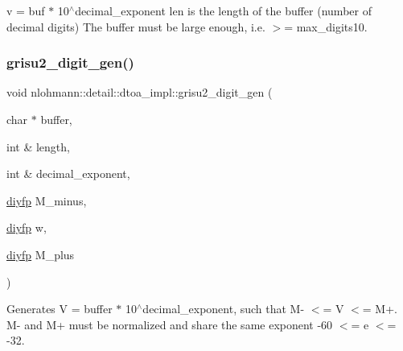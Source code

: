 v = buf $\ast$ 10$^\wedge$decimal\+\_\+exponent len is the length of the buffer (number of decimal digits) The buffer must be large enough, i.\+e. $>$= max\+\_\+digits10. \mbox{\label{namespacenlohmann_1_1detail_1_1dtoa__impl_a9b899c72b0e1e3dd46d75c2b4e6bcdfb}} 
\subsubsection{\texorpdfstring{grisu2\_digit\_gen()}{grisu2\_digit\_gen()}}
{\footnotesize\ttfamily void nlohmann\+::detail\+::dtoa\+\_\+impl\+::grisu2\+\_\+digit\+\_\+gen (\begin{DoxyParamCaption}\item[{char $\ast$}]{buffer,  }\item[{int \&}]{length,  }\item[{int \&}]{decimal\+\_\+exponent,  }\item[{\mbox{\hyperlink{structnlohmann_1_1detail_1_1dtoa__impl_1_1diyfp}{diyfp}}}]{M\+\_\+minus,  }\item[{\mbox{\hyperlink{structnlohmann_1_1detail_1_1dtoa__impl_1_1diyfp}{diyfp}}}]{w,  }\item[{\mbox{\hyperlink{structnlohmann_1_1detail_1_1dtoa__impl_1_1diyfp}{diyfp}}}]{M\+\_\+plus }\end{DoxyParamCaption})\hspace{0.3cm}{\ttfamily [inline]}}

Generates V = buffer $\ast$ 10$^\wedge$decimal\+\_\+exponent, such that M-\/ $<$= V $<$= M+. M-\/ and M+ must be normalized and share the same exponent -\/60 $<$= e $<$= -\/32. 